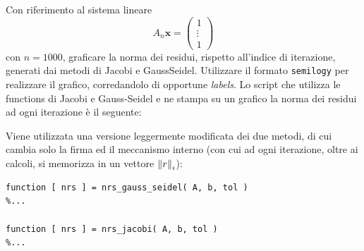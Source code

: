 Con riferimento al sistema lineare
\begin{equation*}
	A_n \mathbf{x} = \begin{pmatrix} 1 \\ \vdots \\ 1 \end{pmatrix}
\end{equation*}
con $n = 1000$, graficare la norma dei residui, rispetto all’indice di iterazione, generati dai metodi di Jacobi e GaussSeidel.
Utilizzare il formato \lstinline{semilogy} per realizzare il grafico, corredandolo di opportune \textit{labels}.
\PP
Lo script che utilizza le functions di Jacobi e Gauss-Seidel e ne stampa su un grafico la norma dei residui ad ogni iterazione è il seguente:

Viene utilizzata una versione leggermente modificata dei due metodi, di cui cambia solo la firma ed il meccanismo interno (con cui ad ogni iterazione, oltre ai calcoli, si memorizza in un vettore $\norm{r}_i$):
\begin{lstlisting}[frame=single]
function [ nrs ] = nrs_gauss_seidel( A, b, tol )
%...

function [ nrs ] = nrs_jacobi( A, b, tol )
%...
\end{lstlisting}

